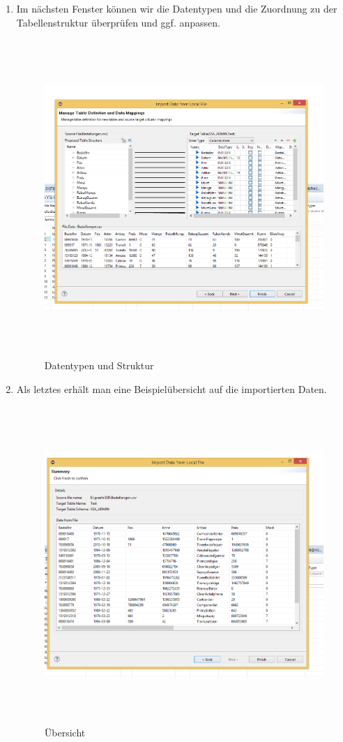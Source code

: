 \documentclass[a4paper, 12pt]{scrartcl}
\begin{document}
\begin{description}
\begin{enumerate}
      \item Im nächsten Fenster können wir die Datentypen und die Zuordnung zu der Tabellenstruktur überprüfen und ggf. anpassen. 

\begin{figure}[H]
\centering
\includegraphics[height=12cm, width=15cm, keepaspectratio]{hanadb5.png}
\caption{Datentypen und Struktur}
\end{figure}    

      \item Als letztes erhält man eine Beispielübersicht auf die importierten Daten.

\begin{figure}[H]
\centering
\includegraphics[height=12cm, width=15cm, keepaspectratio]{hanadb6.png}
\caption{Übersicht}
\end{figure}    


   \end{enumerate}  
  
\end{description}
\end{document}
